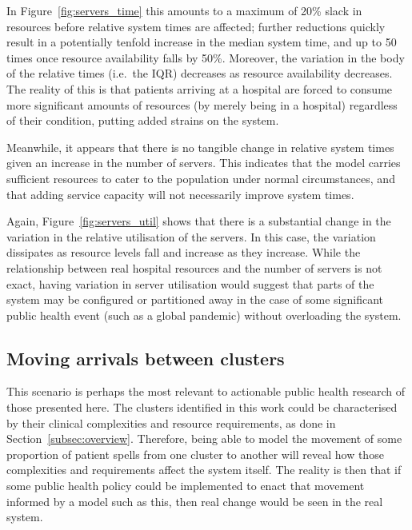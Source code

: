 \documentclass[11pt]{article}
\begin{document}
In Figure~\ref{fig:servers_time} this amounts to a maximum of 20\% slack in
resources before relative system times are affected; further reductions quickly
result in a potentially tenfold increase in the median system time, and up to 50
times once resource availability falls by 50\%. Moreover, the variation in the
body of the relative times (i.e.\ the IQR) decreases as resource availability
decreases. The reality of this is that patients arriving at a hospital are
forced to consume more significant amounts of resources (by merely being in a
hospital) regardless of their condition, putting added strains on the system.

Meanwhile, it appears that there is no tangible change in relative system times
given an increase in the number of servers. This indicates that the model
carries sufficient resources to cater to the population under normal
circumstances, and that adding service capacity will not necessarily improve
system times.

Again, Figure~\ref{fig:servers_util} shows that there is a substantial change in
the variation in the relative utilisation of the servers. In this case, the
variation dissipates as resource levels fall and increase as they increase.
While the relationship between real hospital resources and the number of servers
is not exact, having variation in server utilisation would suggest that parts of
the system may be configured or partitioned away in the case of some significant
public health event (such as a global pandemic) without overloading the system.


\subsection{Moving arrivals between clusters}\label{subsec:moving}

This scenario is perhaps the most relevant to actionable public health research
of those presented here. The clusters identified in this work could be
characterised by their clinical complexities and resource requirements, as done
in Section~\ref{subsec:overview}. Therefore, being able to model the movement of
some proportion of patient spells from one cluster to another will reveal how
those complexities and requirements affect the system itself. The reality is
then that if some public health policy could be implemented to enact that
movement informed by a model such as this, then real change would be seen in the
real system.
\end{document}
